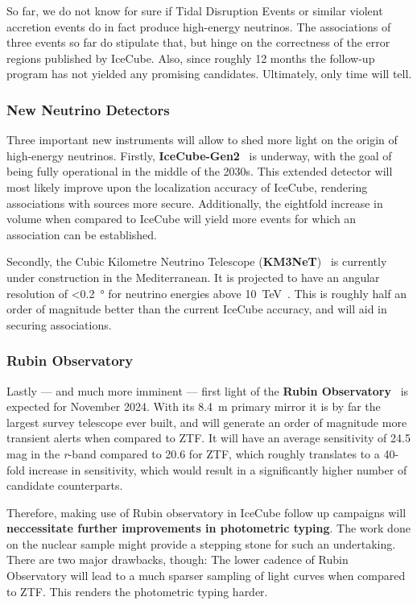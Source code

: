 So far, we do not know for sure if Tidal Disruption Events or similar violent accretion events do in fact produce high-energy neutrinos. The associations of three events so far do stipulate that, but hinge on the correctness of the error regions published by IceCube. Also, since roughly 12 months the follow-up program has not yielded any promising candidates. Ultimately, only time will tell.

\subsubsection{New Neutrino Detectors}
Three important new instruments will allow to shed more light on the origin of high-energy neutrinos. Firstly, \textbf{IceCube-Gen2}~ is underway, with the goal of being fully operational in the middle of the 2030s. This extended detector will most likely improve upon the localization accuracy of IceCube, rendering associations with sources more secure. Additionally, the eightfold increase in volume when compared to IceCube will yield more events for which an association can be established.

Secondly, the Cubic Kilometre Neutrino Telescope (\textbf{KM3NeT})~ is currently under construction in the Mediterranean. It is projected to have an angular resolution of \SI{<0.2}{\degree} for neutrino energies above \SI{10}{\tera\eV}~. This is roughly half an order of magnitude better than the current IceCube accuracy, and will aid in securing associations.

\subsubsection{Rubin Observatory}
Lastly --- and much more imminent --- first light of the \textbf{Rubin Observatory}~\cite{Ivezic2019} is expected for November 2024. With its \SI{8.4}{\m} primary mirror it is by far the largest survey telescope ever built, and will generate an order of magnitude more transient alerts when compared to ZTF. It will have an average sensitivity of 24.5 mag in the \textit{r}-band compared to 20.6 for ZTF, which roughly translates to a 40-fold increase in sensitivity, which would result in a significantly higher number of candidate counterparts.

Therefore, making use of Rubin observatory in IceCube follow up campaigns will \textbf{neccessitate further improvements in photometric typing}. The work done on the nuclear sample might provide a stepping stone for such an undertaking. There are two major drawbacks, though: The lower cadence of Rubin Observatory will lead to a much sparser sampling of light curves when compared to ZTF. This renders the photometric typing harder.

